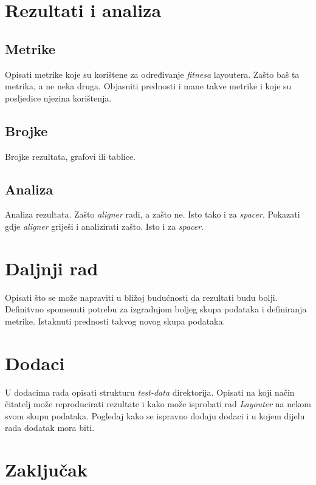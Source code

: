 \documentclass[times, utf8, zavrsni]{fer}
\begin{document}
\chapter{Rezultati i analiza}
\section{Metrike}
Opisati metrike koje su korištene za određivanje \emph{fitnesa} layoutera.
Zašto baš ta metrika, a ne neka druga. Objasniti prednosti i mane takve metrike
i koje su posljedice njezina korištenja.

\section{Brojke}
Brojke rezultata, grafovi ili tablice.

\section{Analiza}
Analiza rezultata. Zašto \emph{aligner} radi, a zašto ne. Isto tako i za
\emph{spacer}. Pokazati gdje \emph{aligner} griješi i analizirati zašto. Isto i za
\emph{spacer}.

\chapter{Daljnji rad}
Opisati što se može napraviti u bližoj budućnosti da rezultati budu bolji.
Definitvno spomenuti potrebu za izgradnjom boljeg skupa podataka i definiranja
metrike. Istaknuti prednosti takvog novog skupa podataka.

\chapter{Dodaci}
U dodacima rada opisati strukturu \emph{test-data} direktorija. Opisati
na koji način čitatelj može reproducirati rezultate i kako može isprobati rad
\emph{Layouter} na nekom svom skupu podataka. Pogledaj kako se ispravno dodaju
dodaci i u kojem dijelu rada dodatak mora biti.

\chapter{Zaključak}




\begin{sazetak}

\kljucnerijeci{}
\end{sazetak}

\begin{abstract}

\keywords{}
\end{abstract}
\end{document}
